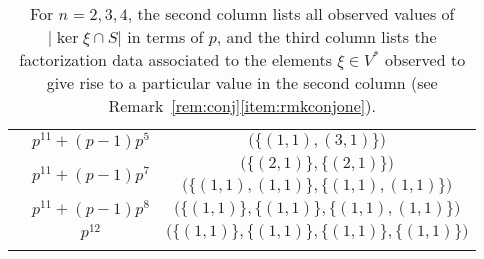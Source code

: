 \begin{table}[h]
\begin{tabular}{ccc}
\cmidrule(l){2-3}
&$p^{11}+(p-1)p^5$&$\big(\big\{(1,1),(3,1)\big\}\big)$\\
\cmidrule(l){2-3}
&\multirow{2}{*}{$p^{11}+(p-1)p^7$}&$\big(\big\{(2,1)\big\},\big\{(2,1)\big\}\big)$\\
&&$\big(\big\{(1,1),(1,1)\big\},\big\{(1,1),(1,1)\big\}\big)$\\
\cmidrule(l){2-3}
&$p^{11}+(p-1)p^8$&$\big(\big\{(1,1)\big\},\big\{(1,1)\big\},\big\{(1,1),(1,1)\big\}\big)$\\
\cmidrule(l){2-3}
&$p^{12}$&$\big(\big\{(1,1)\big\},\big\{(1,1)\big\},\big\{(1,1)\big\},\big\{(1,1)\big\}\big)$\\
\bottomrule\\
\end{tabular}
\caption{For $n=2,3,4$, the second column lists all observed values of $|\ker\xi\cap S|$ in terms of $p$, and the third column lists the factorization data associated to the elements $\xi\in V^*$ observed to give rise to a particular value in the second column (see Remark~\ref{rem:conj}\eqref{item:rmkconjone}).}
\label{tab:lowdim}
\end{table}

